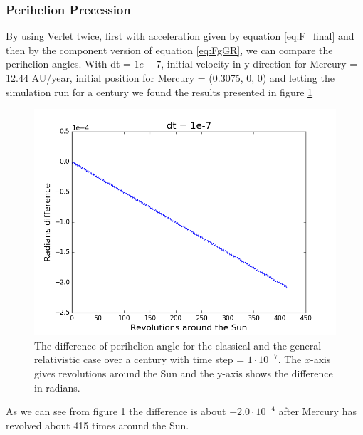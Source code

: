 \documentclass{article}
\newcommand{\E}[1]{\cdot 10^{#1}}
\begin{document}
\subsubsection{Perihelion Precession}
By using Verlet twice, first with acceleration given by equation \eqref{eq:F_final} and then by the component version of equation \eqref{eq:FgGR}, we can compare the perihelion angles. With dt = $1e-7$, initial velocity in y-direction for Mercury = 12.44 AU/year, initial position for Mercury = (0.3075, 0, 0) and letting the simulation run for a century we found the results presented in figure \ref{fig:perihelion}
\begin{figure}[H]
\centering
\includegraphics[scale=0.45]{../figures/perheliondt1e-7.png}
\caption{The difference of perihelion angle for the classical and the general relativistic case over a century with time step = $1\E{-7}$. The $x$-axis gives revolutions around the Sun and the y-axis shows the difference in radians.}
\label{fig:perihelion}
\end{figure}
As we can see from figure \ref{fig:perihelion} the difference is about $-2.0 \E{-4}$ after Mercury has revolved about 415 times around the Sun. 
\end{document}
